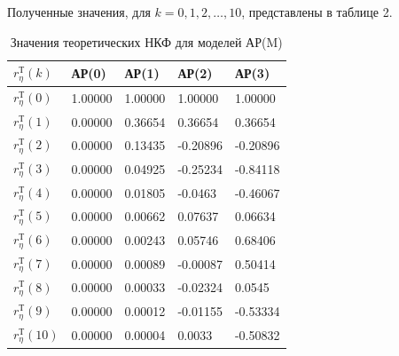 \documentclass[12pt, fleqn]{article}
\begin{document}
{{		Полученные значения, для $k = 0,1,2,\dots,10$, представлены в таблице 2.
		\begin{table}[H]\label{tbl_ncf_ar}
			\centering
			\caption{Значения теоретических НКФ для моделей АР(M)}
			\begin{tabularx}{0.9\textwidth}{ |Y|Y|Y|Y|Y| }
				\hline
				$r_{\eta}^{\text{Т}}(k)$  & АР(0) & АР(1) & АР(2)  & АР(3)  \\ \hline
				$r_{\eta}^{\text{Т}}(0)$  & 1.00000 & 1.00000 & 1.00000  & 1.00000  \\ \hline
				$r_{\eta}^{\text{Т}}(1)$  & 0.00000 & 0.36654 & 0.36654  & 0.36654  \\ \hline
				$r_{\eta}^{\text{Т}}(2)$  & 0.00000 & 0.13435 & -0.20896 & -0.20896 \\ \hline
				$r_{\eta}^{\text{Т}}(3)$  & 0.00000 & 0.04925 & -0.25234 & -0.84118 \\ \hline
				$r_{\eta}^{\text{Т}}(4)$  & 0.00000 & 0.01805 & -0.0463  & -0.46067 \\ \hline
				$r_{\eta}^{\text{Т}}(5)$  & 0.00000 & 0.00662 & 0.07637  & 0.06634  \\ \hline
				$r_{\eta}^{\text{Т}}(6)$  & 0.00000 & 0.00243 & 0.05746  & 0.68406  \\ \hline
				$r_{\eta}^{\text{Т}}(7)$  & 0.00000 & 0.00089 & -0.00087 & 0.50414  \\ \hline
				$r_{\eta}^{\text{Т}}(8)$  & 0.00000 & 0.00033 & -0.02324 & 0.0545   \\ \hline
				$r_{\eta}^{\text{Т}}(9)$  & 0.00000 & 0.00012 & -0.01155 & -0.53334 \\ \hline
				$r_{\eta}^{\text{Т}}(10)$ & 0.00000 & 0.00004 & 0.0033   & -0.50832 \\ \hline
			\end{tabularx}
		\end{table}
									
}}
\end{document}
